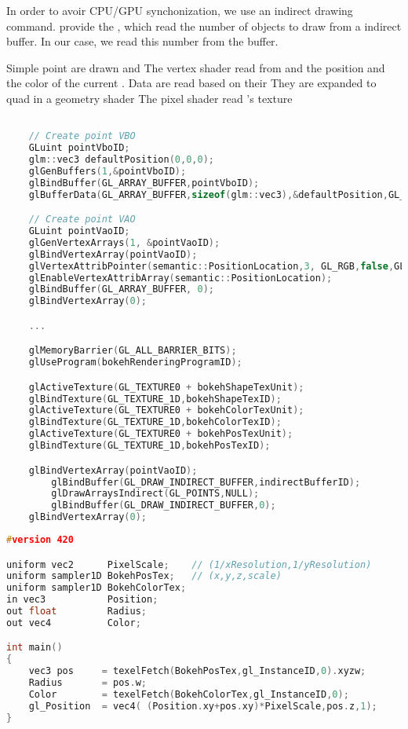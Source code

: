 In order to avoir CPU/GPU synchonization, we use an indirect drawing command. \opengl provide the , which read the number of objects to draw from a indirect buffer. In our case, we read this number from the  buffer.

Simple point are drawn and 
The vertex shader read from  and  the position and the color of the current \bokeh. Data are read based on their 
They are expanded to quad in a geometry shader
The pixel shader read \bokeh's texture



\begin{lstlisting}[language=C++,float={htb},caption={Your caption.},label={YourName:listing1}]

	// Create point VBO
	GLuint pointVboID;
	glm::vec3 defaultPosition(0,0,0);
	glGenBuffers(1,&pointVboID);
	glBindBuffer(GL_ARRAY_BUFFER,pointVboID);
	glBufferData(GL_ARRAY_BUFFER,sizeof(glm::vec3),&defaultPosition,GL_STATIC_DRAW);

	// Create point VAO
	GLuint pointVaoID;
	glGenVertexArrays(1, &pointVaoID);
	glBindVertexArray(pointVaoID);
	glVertexAttribPointer(semantic::PositionLocation,3, GL_RGB,false,GL_FLOAT,GLF_BUFFER_OFFSET(_offset));
	glEnableVertexAttribArray(semantic::PositionLocation);
	glBindBuffer(GL_ARRAY_BUFFER, 0);
	glBindVertexArray(0);

	...

	glMemoryBarrier(GL_ALL_BARRIER_BITS);
	glUseProgram(bokehRenderingProgramID);

	glActiveTexture(GL_TEXTURE0 + bokehShapeTexUnit);
	glBindTexture(GL_TEXTURE_1D,bokehShapeTexID);
	glActiveTexture(GL_TEXTURE0 + bokehColorTexUnit);
	glBindTexture(GL_TEXTURE_1D,bokehColorTexID);
	glActiveTexture(GL_TEXTURE0 + bokehPosTexUnit);
	glBindTexture(GL_TEXTURE_1D,bokehPosTexID);

	glBindVertexArray(pointVaoID);
		glBindBuffer(GL_DRAW_INDIRECT_BUFFER,indirectBufferID);
		glDrawArraysIndirect(GL_POINTS,NULL);
		glBindBuffer(GL_DRAW_INDIRECT_BUFFER,0);
	glBindVertexArray(0);

\end{lstlisting}


\begin{lstlisting}[language=C++,float={htb},caption={Vertex shader for rendering bokeh.},label={YourName:listing1}]
#version 420

uniform vec2      PixelScale;    // (1/xResolution,1/yResolution)
uniform sampler1D BokehPosTex;   // (x,y,z,scale)
uniform sampler1D BokehColorTex;
in vec3           Position;
out float         Radius;
out vec4          Color;

int main()
{
	vec3 pos     = texelFetch(BokehPosTex,gl_InstanceID,0).xyzw;
	Radius       = pos.w;
	Color        = texelFetch(BokehColorTex,gl_InstanceID,0);
	gl_Position	 = vec4( (Position.xy+pos.xy)*PixelScale,pos.z,1);
}
\end{lstlisting}

